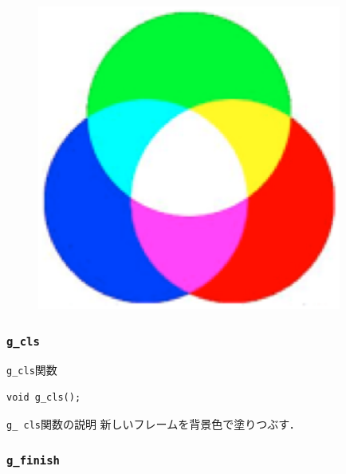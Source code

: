 \documentclass[platex,a4paper,12pt]{jsarticle}%
\begin{document}
\begin{figure}[htb]
\centering
\includegraphics[width=100mm]{./Figures/eps/Canvas_g_scr_color.eps}
\end{figure}



\subsubsection{\texttt{g\_cls}}

\begin{itembox}[l]{\texttt{g\_cls}関数}
\begin{verbatim}
void g_cls();
\end{verbatim}
\end{itembox}

\begin{itembox}[l]{\texttt{g\_ cls}関数の説明}
	新しいフレームを背景色で塗りつぶす．
\end{itembox}


\clearpage
\subsubsection{\texttt{g\_finish}}
\end{document}
